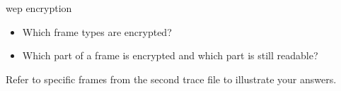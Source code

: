 \begin{exercise}{\ac{wep} encryption}
\begin{enumerate}
		\begin{itemize}
			\item Which frame types are encrypted?\newline
			\begin{esolution}
			\end{esolution}
			\item Which part of a frame is encrypted and which part is still readable?\newline
			\begin{esolution}
			\end{esolution}
		\end{itemize} 
		Refer to specific frames from the second trace file to illustrate your answers.
		
	\end{enumerate}
	
\end{exercise}
	
	
	
